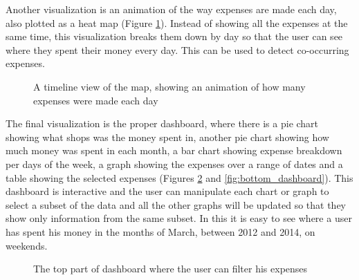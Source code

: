 Another visualization is an animation of the way expenses are made each day, also plotted as a heat map (Figure \ref{fig:timeline}). Instead of showing all the expenses at the same time, this visualization breaks them down by day so that the user can see where they spent their money every day. This can be used to detect co-occurring expenses.

\begin{figure}[htdp]
\begin{center}
\caption{\label{fig:timeline}
A timeline view of the map, showing an animation of how many expenses were made each day}
\end{center}
\end{figure}

The final visualization is the proper dashboard, where there is a pie chart showing what shops was the money spent in, another pie chart showing how much money was spent in each month, a bar chart showing expense breakdown per days of the week, a graph showing the expenses over a range of dates and a table showing the selected expenses (Figures \ref{fig:top_dashboard} and \ref{fig:bottom_dashboard}). This dashboard is interactive and the user can manipulate each chart or graph to select a subset of the data and all the other graphs will be updated so that they show only information from the same subset. In this it is easy to see where a user has spent his money in the months of March, between 2012 and 2014, on weekends. 

\begin{figure}[htdp]
\begin{center}
\caption{\label{fig:top_dashboard}
The top part of dashboard where the user can filter his expenses}
\end{center}
\end{figure}


